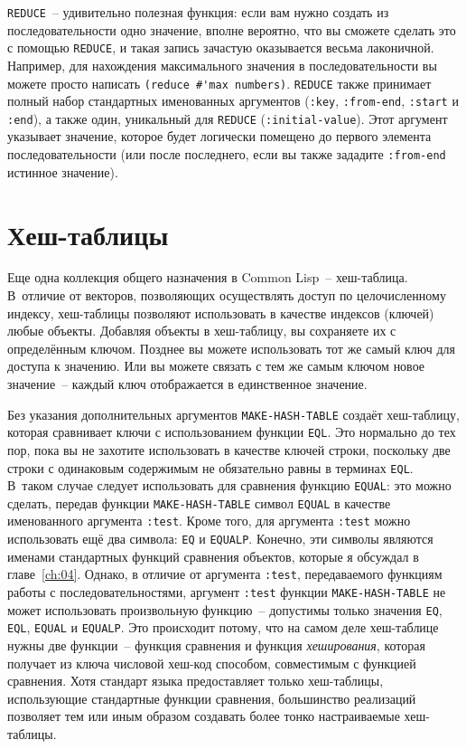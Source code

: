 \lstinline{REDUCE}~-- удивительно полезная функция: если вам нужно создать из
последовательности одно значение, вполне вероятно, что вы сможете сделать это с помощью
\lstinline{REDUCE}, и такая запись зачастую оказывается весьма лаконичной.
Например, для нахождения максимального значения в последовательности вы можете просто
написать \lstinline!(reduce #'max numbers)!. \lstinline{REDUCE} также принимает полный набор
стандартных именованных аргументов (\lstinline{:key}, \lstinline{:from-end}, \lstinline{:start} и
\lstinline{:end}), а также один, уникальный для \lstinline{REDUCE} (\lstinline{:initial-value}).  Этот
аргумент указывает значение, которое будет логически помещено до первого элемента
последовательности (или после последнего, если вы также зададите \lstinline{:from-end} истинное
значение).

\section{Хеш-таблицы}

Еще одна коллекция общего назначения в Common Lisp~-- хеш-таблица.  В~отличие от векторов,
позволяющих осуществлять доступ по целочисленному индексу,
хеш-таблицы позволяют использовать в качестве индексов (ключей) любые объекты.
Добавляя объекты в хеш-таблицу, вы сохраняете их с определённым ключом.  Позднее вы
можете использовать тот же самый ключ для доступа к значению.  Или вы можете связать
с тем же самым ключом новое значение~-- каждый ключ отображается в единственное значение.

Без указания дополнительных аргументов \lstinline{MAKE-HASH-TABLE} создаёт хеш-таблицу, которая
сравнивает ключи с использованием функции \lstinline{EQL}.  Это нормально до тех пор, пока вы
не захотите использовать в качестве ключей строки, поскольку две строки с одинаковым
содержимым не обязательно равны в терминах \lstinline{EQL}.  В~таком случае следует
использовать для сравнения функцию \lstinline{EQUAL}: это можно сделать, передав функции
\lstinline{MAKE-HASH-TABLE} символ \lstinline{EQUAL} в качестве именованного аргумента \lstinline{:test}.
Кроме того, для аргумента \lstinline{:test} можно использовать ещё два символа: \lstinline{EQ} и
\lstinline{EQUALP}.  Конечно, эти символы являются именами стандартных функций сравнения
объектов, которые я обсуждал в главе~\ref{ch:04}.  Однако, в отличие от аргумента \lstinline{:test},
передаваемого функциям работы с последовательностями, аргумент \lstinline{:test} функции
\lstinline{MAKE-HASH-TABLE} не может использовать произвольную функцию~-- допустимы только
значения \lstinline{EQ}, \lstinline{EQL}, \lstinline{EQUAL} и \lstinline{EQUALP}.  Это происходит потому, что
на самом деле хеш-таблице нужны две функции~-- функция сравнения и функция
\textit{хеширования}, которая получает из ключа числовой хеш-код способом, совместимым с
функцией сравнения.  Хотя стандарт языка предоставляет
только хеш-таблицы, использующие стандартные функции сравнения, большинство
реализаций позволяет тем или иным образом создавать более тонко настраиваемые
хеш-таблицы.

